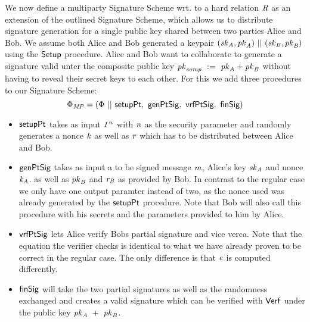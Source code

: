 \begin{definition}
    \label{def:twoPartySig}
    We now define a multiparty Signature Scheme wrt. to a hard relation $\mathit{R}$ as an extension of the outlined Signature Scheme,
    which allows us to distribute signature generation for a single public key shared between two parties Alice and Bob. We assume both Alice and Bob generated a keypair $(\mathit{sk}_{\mathit{A}}, \mathit{pk}_{\mathit{A}}) ~||~ (\mathit{sk}_{\mathit{B}}, \mathit{pk}_{\mathit{B}})$
    using the $\mathsf{Setup}$ procedure. Alice and Bob want to collaborate to generate a signature valid unter the composite public key $\mathit{pk}_{\mathit{comp}} ~:=~ \mathit{pk}_{\mathit{A}} + \mathit{pk}_{\mathit{B}}$ without
    having to reveal their secret keys to each other. For this we add three procedures to our Signature Scheme:
    \[ \Phi_{\mathit{MP}} = (\Phi ~||~ \mathsf{setupPt} ,~ \mathsf{genPtSig} ,~ \mathsf{vrfPtSig} ,~ \mathsf{finSig}) \]
    \begin{itemize}
        \item $\mathsf{setupPt}$ takes as input $\mathit{1^n}$ with $\mathit{n}$ as the security parameter and randomly generates a nonce $\mathit{k}$ as well as $\mathit{r}$ which has to be distributed
        between Alice and Bob.
        \item $\mathsf{genPtSig}$ takes as input a to be signed message $\mathit{m}$, Alice's key $\mathit{sk}_{\mathit{A}}$ and nonce $\mathit{\mathit{k}_{\mathit{A}}}$. as well as $\mathit{pk}_{\mathit{B}}$ and $\mathit{r}_{\mathit{B}}$ as provided
        by Bob. In contrast to the regular case we only have one output paramter instead of two, as the nonce used was already generated by the $\mathsf{setupPt}$ procedure.
        Note that Bob will also call this procedure with his secrets and the parameters provided to him by Alice.
        \item $\mathsf{vrfPtSig}$ lets Alice verify Bobs partial signature and vice verca. Note that the equation the verifier checks is identical to what we have already proven to be correct in the regular
        case. The only difference is that $\mathit{e}$ is computed differently.
        \item $\mathsf{finSig}$ will take the two partial signatures as well as the randomness exchanged and creates a valid signature which can be verified with $\mathsf{Verf}$ under the public key
        $\mathit{pk}_{\mathit{A}} ~+~ \mathit{pk}_{\mathit{B}}$.
    \end{itemize}
\end{definition}

